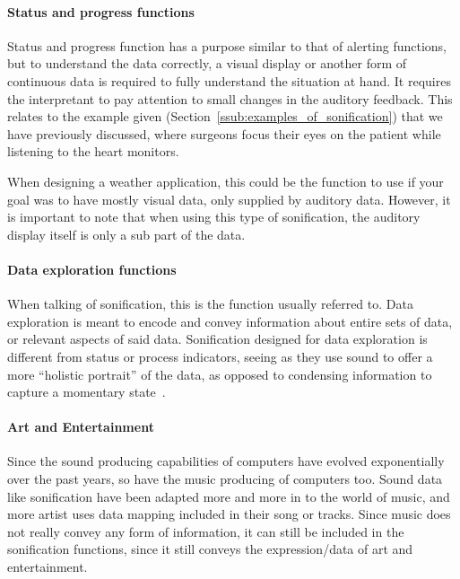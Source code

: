 

\paragraph{Status and progress functions} %
\label{par:status_and_progress_functions}

Status and progress function has a purpose similar to that of alerting functions, but to understand the data correctly, a visual display or another form of continuous data is required to fully understand the situation at hand. 
It requires the interpretant to pay attention to small changes in the auditory feedback. 
This relates to the example given (Section~\ref{ssub:examples_of_sonification}) that we have previously discussed, where surgeons focus their eyes on the patient while listening to the heart monitors.

When designing a weather application, this could be the function to use if your goal was to have mostly visual data, only supplied by auditory data. 
However, it is important to note that when using this type of sonification, the auditory display itself is only a sub part of the data. 



\paragraph{Data exploration functions} %
\label{par:data_exploration_functions}

When talking of sonification, this is the function usually referred to. 
Data exploration is meant to encode and convey information about entire sets of data, or relevant aspects of said data.
Sonification designed for data exploration is different from status or process indicators, seeing as they use sound to offer a more \enquote{holistic portrait} of the data, as opposed to condensing information to capture a momentary state~\cite*{walker2011}.



\paragraph{Art and Entertainment} %
\label{par:art_and_entertainment}

Since the sound producing capabilities of computers have evolved exponentially over the past years, so have the music producing of computers too. 
Sound data like sonification have been adapted more and more in to the world of music, and more artist uses data mapping included in their song or tracks. 
Since music does not really convey any form of information, it can still be included in the sonification functions, since it still conveys the expression/data of art and entertainment.

